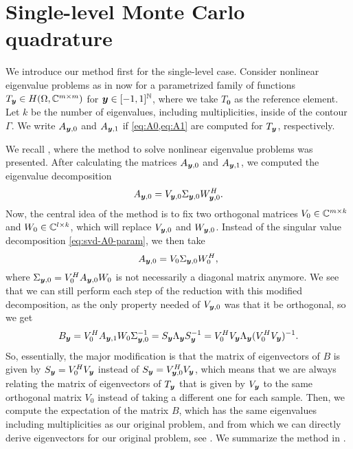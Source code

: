 \section{Single-level Monte Carlo quadrature}
We introduce our method first for the single-level case.
Consider nonlinear eigenvalue problems as in  now for a parametrized family of functions $T_{{\boldsymbol y}} \in H(\Omega, \mathbb{C}^{m \times m})$ for ${\boldsymbol y}\in [-1,1]^{\mathbb{N}}$, where we take $T_\mathbf{0}$ as the reference element.
Let $k$ be the number of eigenvalues, including multiplicities, inside of the contour $\Gamma$.
We write $A_{{\boldsymbol y}, 0}$ and $A_{{\boldsymbol y}, 1}$ if \cref{eq:A0,eq:A1} are computed for $T_{{\boldsymbol y}}$, respectively.

We recall , where the method to solve nonlinear eigenvalue problems was presented.
After calculating the matrices $A_{{\boldsymbol y}, 0}$ and $A_{{\boldsymbol y}, 1}$, we computed the eigenvalue decomposition 
\begin{equation}
    \label{eq:svd-A0-param}
    A_{\bs{y}, 0} = V_{\bs{y},0} \Sigma_{\bs{y},0} W_{\bs{y}, 0}\hm.
\end{equation}
Now, the central idea of the method is to fix two orthogonal matrices $V_0 \in \mathbb{C}^{m\times k}$ and $W_0 \in \mathbb{C}^{l\times k}$, which will replace $V_{{\boldsymbol y},0}$ and $W_{{\boldsymbol y}, 0}$.
Instead of the singular value decomposition \eqref{eq:svd-A0-param}, we then take
\begin{equation}
    A_{{\boldsymbol y}, 0} = V_0 \Sigma_{{\boldsymbol y},0} W_0^H,
\end{equation}
where $\Sigma_{{\boldsymbol y},0} = V_0^H A_{{\boldsymbol y}, 0} W_0$ is not necessarily a diagonal matrix anymore.
We see that we can still perform each step of the reduction with this modified decomposition, as the only property needed of $V_{{\boldsymbol y},0}$ was that it be orthogonal, so we get
\[ 
    B_{{\boldsymbol y}} = V_0^H A_{{\boldsymbol y},1} W_0 \Sigma_{{\boldsymbol y},0}^{-1} = S_{{\boldsymbol y}}\Lambda_{{\boldsymbol y}} S_{{\boldsymbol y}}^{-1} = V_0^H V_{{\boldsymbol y}} \Lambda_{{\boldsymbol y}} (V_0^H V_{{\boldsymbol y}})^{-1}.
\]
So, essentially, the major modification is that the matrix of eigenvectors of $B$ is given by $S_{{\boldsymbol y}} = V_0^H V_{{\boldsymbol y}}$ instead of $S_{{\boldsymbol y}} = V_{{\boldsymbol y},0}^H V_{{\boldsymbol y}}$, which means that we are always relating the matrix of eigenvectors of $T_{{\boldsymbol y}}$ that is given by $V_{{\boldsymbol y}}$ to the same orthogonal matrix $V_0$ instead of taking a different one for each sample.
Then, we compute the expectation of the matrix $B$, which has the same eigenvalues including multiplicities as our original problem, and from which we can directly derive eigenvectors for our original problem, see .
We summarize the method in .

